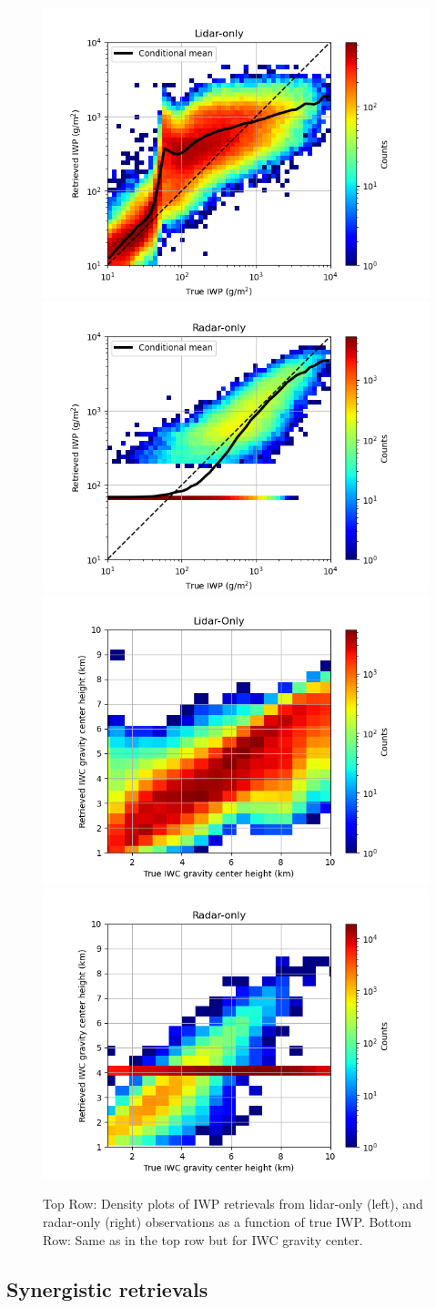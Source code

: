 \documentclass{ametsocV6.1}
\begin{document}
\begin{figure}
    \centering
    \includegraphics[width=.481\linewidth]{fig07a.rev.png}
    \includegraphics[width=.481\linewidth]{fig07b.rev.png}
    \includegraphics[width=.481\linewidth]{fig07c.rev.png}
    \includegraphics[width=.481\linewidth]{fig07d.rev.png}
    \caption{Top Row: Density plots of IWP retrievals from lidar-only (left), and radar-only (right) observations as a function
    of true IWP. Bottom Row: Same as in the top row but for IWC gravity center.}\label{f7}
\end{figure}

\subsection{Synergistic retrievals}
\end{document}
